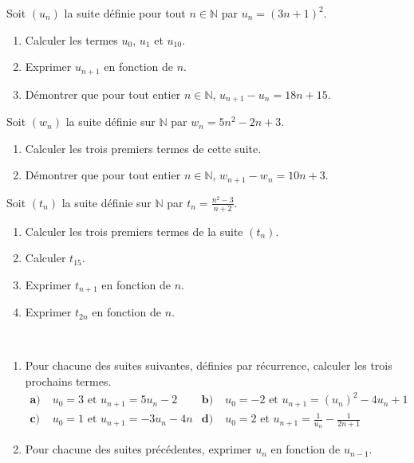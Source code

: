\documentclass[11pt]{article}
\title{}
\date{}
\author{}
\begin{document}

\begin{exo}
  Soit $(u_n)$ la suite définie pour tout $n \in \mathbb{N}$ par $u_n = (3n + 1)^2$.
\begin{enumerate}
    \item Calculer les termes $u_0$, $u_1$ et $u_{10}$.
    \item Exprimer $u_{n+1}$ en fonction de $n$.
    \item Démontrer que pour tout entier $n \in \mathbb{N}$, $u_{n+1} - u_n = 18n + 15$.
\end{enumerate}
\end{exo}

\begin{exo}
  Soit $(w_n)$ la suite définie sur $\mathbb{N}$ par $w_n = 5n^2 - 2n + 3$.
\begin{enumerate}
    \item Calculer les trois premiers termes de cette suite.
    \item Démontrer que pour tout entier $n \in \mathbb{N}$, $w_{n+1} - w_n = 10n + 3$.
\end{enumerate}
\end{exo}

\begin{exo}
  Soit $(t_n)$ la suite définie sur $\mathbb{N}$ par $t_n =
  \frac{n^2-3}{n+2}$.
\begin{enumerate}
    \item Calculer les trois premiers termes de la suite $(t_n)$.
    \item Calculer $t_{15}$.
    \item Exprimer $t_{n+1}$ en fonction de $n$.
    \item Exprimer $t_{2n}$ en fonction de $n$.
\end{enumerate}
\end{exo}

\begin{exo}~
  \begin{enumerate}
    \item Pour chacune des suites suivantes, définies par récurrence, calculer
      les trois prochains termes.
      \begin{align*}
        \textbf{a)}&\; u_0 = 3\text{ et }u_{n+1} = 5u_n - 2 &
        \textbf{b)}&\; u_0 = -2\text{ et }u_{n+1} = (u_n)^2 - 4u_n+1 \\
        \textbf{c)}&\; u_0 = 1\text{ et }u_{n+1} = -3u_n - 4n &
        \textbf{d)}&\; u_0 = 2\text{ et }u_{n+1} = \frac{1}{u_n}-\frac{1}{2n+1}
      \end{align*}
    \item Pour chacune des suites précédentes, exprimer $u_n$ en fonction de $u_{n-1}$.
\end{enumerate}
\end{exo}
\end{document}
